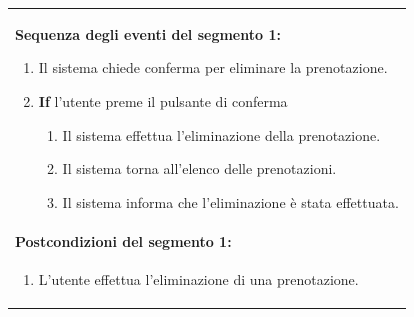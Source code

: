 \documentclass{article}
\begin{document}
\begin{table}[H]
\begin{tabular}{|p{\linewidth}|}
                        \vspace{-5pt} \\
                        \hline
                        \textbf{Sequenza degli eventi del segmento 1:}
                        \begin{enumerate}
                            \item Il sistema chiede conferma per eliminare la prenotazione.
                            \item \textbf{If} l'utente preme il pulsante di conferma
                            \begin{enumerate}
                                \item Il sistema effettua l'eliminazione della prenotazione.
                                \item Il sistema torna all'elenco delle prenotazioni.
                                \item Il sistema informa che l'eliminazione è stata effettuata.
                            \end{enumerate}
                        \end{enumerate} \\
                        \hline
                        \cellcolor{gray!20}
                        \textbf{Postcondizioni del segmento 1:} \\
                        \cellcolor{gray!20}
                        \begin{minipage}{\linewidth}
                            \begin{enumerate}
                                \item L'utente effettua l'eliminazione di una prenotazione.
                            \end{enumerate}
                        \end{minipage} \\
                        \hline
                    \end{tabular}
                \end{table}
\end{document}
